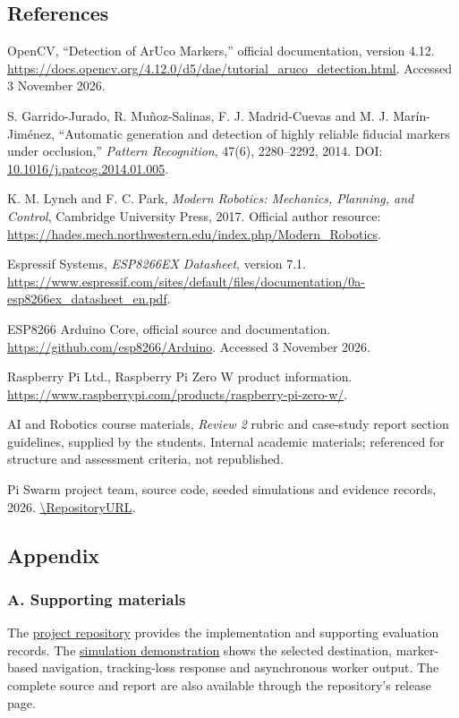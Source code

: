 \documentclass[11pt,a4paper]{article}
\begin{document}
\subsection{References}
\begin{enumerate}[label={[\arabic*]},ref=\arabic*,itemsep=7pt]
\item\label{ref:opencv} OpenCV, ``Detection of ArUco Markers,'' official documentation,
version 4.12. \url{https://docs.opencv.org/4.12.0/d5/dae/tutorial_aruco_detection.html}.
Accessed 3 November 2026.
\item\label{ref:aruco} S. Garrido-Jurado, R. Mu\~noz-Salinas, F. J. Madrid-Cuevas and
M. J. Mar\'in-Jim\'enez, ``Automatic generation and detection of highly reliable
fiducial markers under occlusion,'' \textit{Pattern Recognition}, 47(6),
2280--2292, 2014. DOI: \href{https://doi.org/10.1016/j.patcog.2014.01.005}{10.1016/j.patcog.2014.01.005}.
\item\label{ref:robotics} K. M. Lynch and F. C. Park, \textit{Modern Robotics:
Mechanics, Planning, and Control}, Cambridge University Press, 2017.
Official author resource: \url{https://hades.mech.northwestern.edu/index.php/Modern_Robotics}.
\item\label{ref:esp} Espressif Systems, \textit{ESP8266EX Datasheet}, version 7.1.
\url{https://www.espressif.com/sites/default/files/documentation/0a-esp8266ex_datasheet_en.pdf}.
\item\label{ref:esparduino} ESP8266 Arduino Core, official source and documentation.
\url{https://github.com/esp8266/Arduino}. Accessed 3 November 2026.
\item\label{ref:pi} Raspberry Pi Ltd., Raspberry Pi Zero W product information.
\url{https://www.raspberrypi.com/products/raspberry-pi-zero-w/}.
\item\label{ref:course} AI and Robotics course materials, \textit{Review 2} rubric and
case-study report section guidelines, supplied by the students. Internal academic
materials; referenced for structure and assessment criteria, not republished.
\item\label{ref:project} Pi Swarm project team, source code, seeded simulations and
evidence records, 2026. \expandafter\url\expandafter{\RepositoryURL}.
\end{enumerate}

\subsection{Appendix}
\subsubsection*{A. Supporting materials}
The \href{https://github.com/Kapilkannaa/pi-swarm-robotics}{project repository}
provides the implementation and supporting evaluation records. The
\href{https://github.com/Kapilkannaa/pi-swarm-robotics/releases/download/review2-2026-11-03/Pi-Swarm-Simulation.mp4}{simulation demonstration}
shows the selected destination, marker-based navigation, tracking-loss response
and asynchronous worker output. The complete source and report are also available
through the repository's release page.
\end{document}
